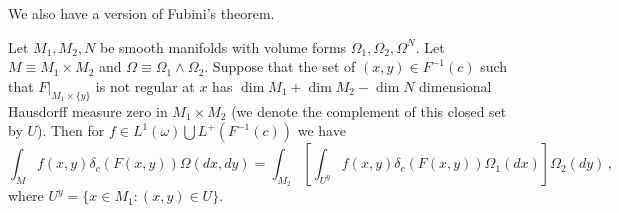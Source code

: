 We also have a version of Fubini's theorem.
\begin{theorem}
Let $M_1,M_2,N$ be smooth manifolds with volume forms $\Omega_1,\Omega_2, \Omega^N$. Let $M\equiv M_1\times M_2$ and $\Omega\equiv \Omega_1\wedge\Omega_2$. Suppose that the set of $(x,y)\in F^{-1}(c)$ such that $F|_{M_1\times\{y\}}$ is not regular at $x$ has $\dim M_1+\dim M_2-\dim N$ dimensional Hausdorff measure zero in $M_1\times M_2$ (we denote the complement of this closed set by $U$). Then for $f\in L^1(\omega)\bigcup L^+(F^{-1}(c))$ we have
\begin{equation}\label{FubiniEq}
\int_Mf(x,y)\delta_c(F(x,y)) \Omega(dx,dy)=\int_{M_2}\left[\int_{U^y} f(x,y) \delta_c(F(x,y))\Omega_1(dx) \right]\Omega_2(dy)\,,
\end{equation}
where $U^y=\{x\in M_1:(x,y)\in U\}$.
\end{theorem}
